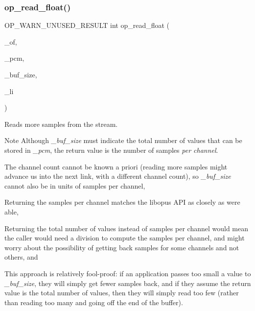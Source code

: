 \subsubsection{\texorpdfstring{op\+\_\+read\+\_\+float()}{op\_read\_float()}}
{\footnotesize\ttfamily O\+P\+\_\+\+W\+A\+R\+N\+\_\+\+U\+N\+U\+S\+E\+D\+\_\+\+R\+E\+S\+U\+LT int op\+\_\+read\+\_\+float (\begin{DoxyParamCaption}\item[{Ogg\+Opus\+File $\ast$}]{\+\_\+of,  }\item[{float $\ast$}]{\+\_\+pcm,  }\item[{int}]{\+\_\+buf\+\_\+size,  }\item[{int $\ast$}]{\+\_\+li }\end{DoxyParamCaption})}

Reads more samples from the stream. \begin{DoxyNote}{Note}
Although {\itshape \+\_\+buf\+\_\+size} must indicate the total number of values that can be stored in {\itshape \+\_\+pcm}, the return value is the number of samples {\itshape per channel}. 
\begin{DoxyEnumerate}
\item The channel count cannot be known a priori (reading more samples might advance us into the next link, with a different channel count), so {\itshape \+\_\+buf\+\_\+size} cannot also be in units of samples per channel, 
\item Returning the samples per channel matches the {\ttfamily libopus} A\+PI as closely as we\textquotesingle{}re able, 
\item Returning the total number of values instead of samples per channel would mean the caller would need a division to compute the samples per channel, and might worry about the possibility of getting back samples for some channels and not others, and 
\item This approach is relatively fool-\/proof\+: if an application passes too small a value to {\itshape \+\_\+buf\+\_\+size}, they will simply get fewer samples back, and if they assume the return value is the total number of values, then they will simply read too few (rather than reading too many and going off the end of the buffer). 
\end{DoxyEnumerate}
\end{DoxyNote}

